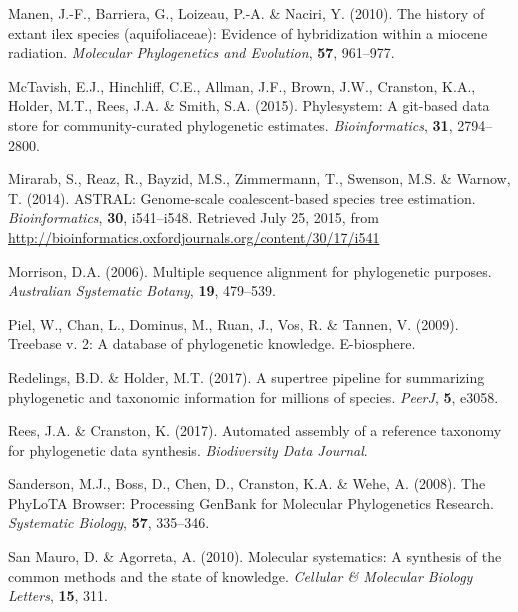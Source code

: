 \documentclass[]{article}
\begin{document}
\leavevmode\hypertarget{ref-manen2010history}{}%
Manen, J.-F., Barriera, G., Loizeau, P.-A. \& Naciri, Y. (2010). The history of extant ilex species (aquifoliaceae): Evidence of hybridization within a miocene radiation. \emph{Molecular Phylogenetics and Evolution}, \textbf{57}, 961--977.

\leavevmode\hypertarget{ref-mctavish2015phylesystem}{}%
McTavish, E.J., Hinchliff, C.E., Allman, J.F., Brown, J.W., Cranston, K.A., Holder, M.T., Rees, J.A. \& Smith, S.A. (2015). Phylesystem: A git-based data store for community-curated phylogenetic estimates. \emph{Bioinformatics}, \textbf{31}, 2794--2800.

\leavevmode\hypertarget{ref-mirarab2014astral}{}%
Mirarab, S., Reaz, R., Bayzid, M.S., Zimmermann, T., Swenson, M.S. \& Warnow, T. (2014). ASTRAL: Genome-scale coalescent-based species tree estimation. \emph{Bioinformatics}, \textbf{30}, i541--i548. Retrieved July 25, 2015, from \url{http://bioinformatics.oxfordjournals.org/content/30/17/i541}

\leavevmode\hypertarget{ref-morrison2006multiple}{}%
Morrison, D.A. (2006). Multiple sequence alignment for phylogenetic purposes. \emph{Australian Systematic Botany}, \textbf{19}, 479--539.

\leavevmode\hypertarget{ref-piel2009treebase}{}%
Piel, W., Chan, L., Dominus, M., Ruan, J., Vos, R. \& Tannen, V. (2009). Treebase v. 2: A database of phylogenetic knowledge. E-biosphere.

\leavevmode\hypertarget{ref-redelings2017supertree}{}%
Redelings, B.D. \& Holder, M.T. (2017). A supertree pipeline for summarizing phylogenetic and taxonomic information for millions of species. \emph{PeerJ}, \textbf{5}, e3058.

\leavevmode\hypertarget{ref-rees2017automated}{}%
Rees, J.A. \& Cranston, K. (2017). Automated assembly of a reference taxonomy for phylogenetic data synthesis. \emph{Biodiversity Data Journal}.

\leavevmode\hypertarget{ref-sanderson2008phylota}{}%
Sanderson, M.J., Boss, D., Chen, D., Cranston, K.A. \& Wehe, A. (2008). The PhyLoTA Browser: Processing GenBank for Molecular Phylogenetics Research. \emph{Systematic Biology}, \textbf{57}, 335--346.

\leavevmode\hypertarget{ref-san2010molecular}{}%
San Mauro, D. \& Agorreta, A. (2010). Molecular systematics: A synthesis of the common methods and the state of knowledge. \emph{Cellular \& Molecular Biology Letters}, \textbf{15}, 311.
\end{document}
